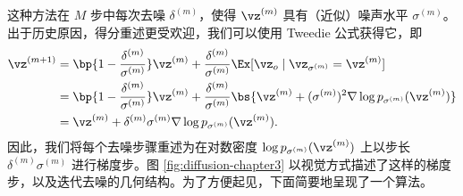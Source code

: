 \documentclass[../../book-main.tex]{subfiles}
\begin{document}
这种方法在 \(M\) 步中每次去噪 \(\delta^{(m)}\)，使得 \(\vz^{(m)}\) 具有（近似）噪声水平 \(\sigma^{(m)}\)。出于历史原因，得分重述更受欢迎，我们可以使用 Tweedie 公式获得它，即
\begin{align}
    \vz^{(m + 1)}
    &= \bp{1 - \frac{\delta^{(m)}}{\sigma^{(m)}}}\vz^{(m)} + \frac{\delta^{(m)}}{\sigma^{(m)}}\Ex[\vz_{o} \mid \vz_{\sigma^{(m)}} = \vz^{(m)}] \\ 
    &=  \bp{1 - \frac{\delta^{(m)}}{\sigma^{(m)}}}\vz^{(m)} + \frac{\delta^{(m)}}{\sigma^{(m)}}\bs{\vz^{(m)} + (\sigma^{(m)})^{2}\nabla \log p_{\sigma^{(m)}}(\vz^{(m)})} \\ 
    &= \vz^{(m)} + \delta^{(m)} \sigma^{(m)}\nabla \log p_{\sigma^{(m)}}(\vz^{(m)}).
\end{align}
因此，我们将每个去噪步骤重述为在对数密度 \(\log p_{\sigma^{(m)}}(\vz^{(m)})\) 上以步长 \(\delta^{(m)} \sigma^{(m)}\) 进行梯度步。图 \ref{fig:diffusion-chapter3} 以视觉方式描述了这样的梯度步，以及迭代去噪的几何结构。为了方便起见，下面简要地呈现了一个算法。
\begin{algorithm}\label{alg:iterative_denoising}
    \caption{迭代去噪}
    \begin{algorithmic}[1]

        
         
        \EndFor
        \Statex{}

 
             
             
             
        \EndFor

        \EndProcedure
    \end{algorithmic}
\end{algorithm}
\end{document}
